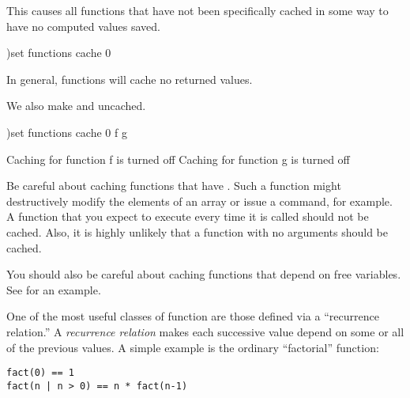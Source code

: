 \begin{xtc}
\begin{xtccomment}
This causes all functions that have not been specifically cached in some way
to have no computed values saved.
\end{xtccomment}
\begin{spadsrc}
)set functions cache 0
\end{spadsrc}
\begin{SysCmdOutput}
 In general, functions will cache no returned values.
\end{SysCmdOutput}
\end{xtc}
\begin{xtc}
\begin{xtccomment}
We also make  and  uncached.
\end{xtccomment}
\begin{spadsrc}
)set functions cache 0 f g
\end{spadsrc}
\begin{SysCmdOutput}
   Caching for function f is turned off
   Caching for function g is turned off
\end{SysCmdOutput}
\end{xtc}

\beginImportant
Be careful about caching functions that have
.
Such a function might destructively modify the elements of an array or
issue a  command, for example.
A function that you expect to execute every time it is called should
not be cached.
Also, it is highly unlikely that a function with no arguments should
be cached.
\endImportant

You should also be careful about caching functions that depend on
free variables.
See 
for an example.


One of the most useful classes of function are those defined via a
``recurrence relation.''
A {\it recurrence relation} makes each successive
value depend on some or all of the previous values.
A simple example is the ordinary ``factorial'' function:
\begin{verbatim}
fact(0) == 1
fact(n | n > 0) == n * fact(n-1)
\end{verbatim}

